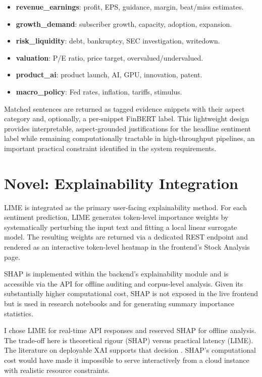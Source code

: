\begin{itemize}
    \item \textbf{revenue\_earnings}: profit, EPS, guidance, margin, beat/miss estimates.
    \item \textbf{growth\_demand}: subscriber growth, capacity, adoption, expansion.
    \item \textbf{risk\_liquidity}: debt, bankruptcy, SEC investigation, writedown.
    \item \textbf{valuation}: P/E ratio, price target, overvalued/undervalued.
    \item \textbf{product\_ai}: product launch, AI, GPU, innovation, patent.
    \item \textbf{macro\_policy}: Fed rates, inflation, tariffs, stimulus.
\end{itemize}

Matched sentences are returned as tagged evidence snippets with their aspect category and, optionally, a per-snippet FinBERT label.  This lightweight design provides interpretable, aspect-grounded justifications for the headline sentiment label while remaining computationally tractable in high-throughput pipelines, an important practical constraint identified in the system requirements.

\section{Novel: Explainability Integration}
\label{sec:explainability_design}

LIME \citep{ribeiro2016lime} is integrated as the primary user-facing explainability method.  For each sentiment prediction, LIME generates token-level importance weights by systematically perturbing the input text and fitting a local linear surrogate model.  The resulting weights are returned via a dedicated REST endpoint and rendered as an interactive token-level heatmap in the frontend's Stock Analysis page.

SHAP \citep{lundberg2017shap} is implemented within the backend's explainability module and is accessible via the API for offline auditing and corpus-level analysis.  Given its substantially higher computational cost, SHAP is not exposed in the live frontend but is used in research notebooks and for generating summary importance statistics.

I chose LIME for real-time API responses and reserved SHAP for offline analysis. The trade-off here is theoretical rigour (SHAP) versus practical latency (LIME). The literature on deployable XAI supports that decision \citep{yeo2023xai}. SHAP's computational cost would have made it impossible to serve interactively from a cloud instance with realistic resource constraints.

